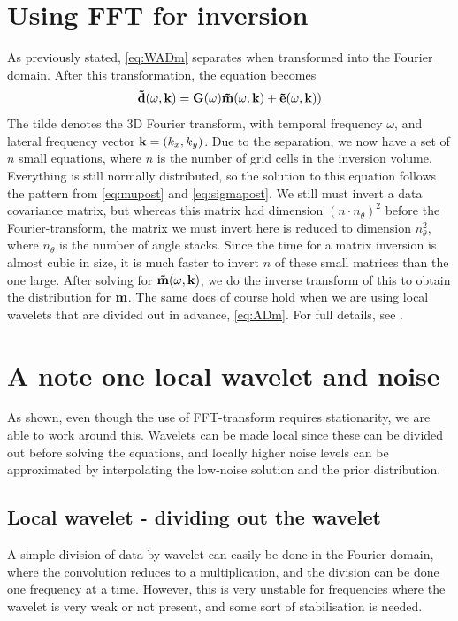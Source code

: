 \section{Using FFT for inversion}
As previously stated, \autoref{eq:WADm} separates when transformed
into the Fourier domain. After this transformation, the equation
becomes
\begin{equation}
\label{eq:fourierinv}
\mathbf{\tilde{d}}(\omega,\mathbf{k}) = \mathbf{G}(\omega)\mathbf{\tilde{m}}(\omega,\mathbf{k}) + \mathbf{\tilde{e}}(\omega,\mathbf{k}))
\end{equation}
The tilde denotes the 3D Fourier transform, with temporal
frequency $\omega$, and lateral frequency vector $\mathbf{k} =
(k_x,k_y)$. Due to the separation, we now have a set of $n$ small
equations, where $n$ is the number of grid cells in the inversion
volume. Everything is still normally distributed, so the solution to
this equation follows the pattern from \autoref{eq:mupost} and
\autoref{eq:sigmapost}. We still must invert a data covariance matrix,
but whereas this matrix had dimension $(n\cdot n_\theta)^2$ before the
Fourier-transform, the matrix we must invert here is reduced to
dimension $n_\theta^2$, where $n_\theta$ is the number of angle
stacks. Since the time for a matrix inversion is almost cubic in size,
it is much faster to invert $n$ of these small matrices than the one
large. After solving for $\mathbf{\tilde{m}}(\omega,\mathbf{k})$, we do
the inverse transform of this to obtain the distribution for
$\mathbf{m}$. The same does of course hold when we are using local
wavelets that are divided out in advance, \autoref{eq:ADm}. For full
details, see \cite{geo68ab2}.

\section{A note one local wavelet and noise}
\label{sec:nonstationaryimp}
As shown, even though the use of FFT-transform requires stationarity,
we are able to work around this. Wavelets can be made local since
these can be divided out before solving the equations, and locally
higher noise levels can be approximated by interpolating the low-noise
solution and the prior distribution.

\subsection{Local wavelet - dividing out the wavelet}
\label{sec:divwavimp}
A simple division of data by wavelet can easily be done in the Fourier
domain, where the convolution reduces to a multiplication, and the
division can be done one frequency at a time. However, this is very
unstable for frequencies where the wavelet is very weak or not
present, and some sort of stabilisation is needed.

